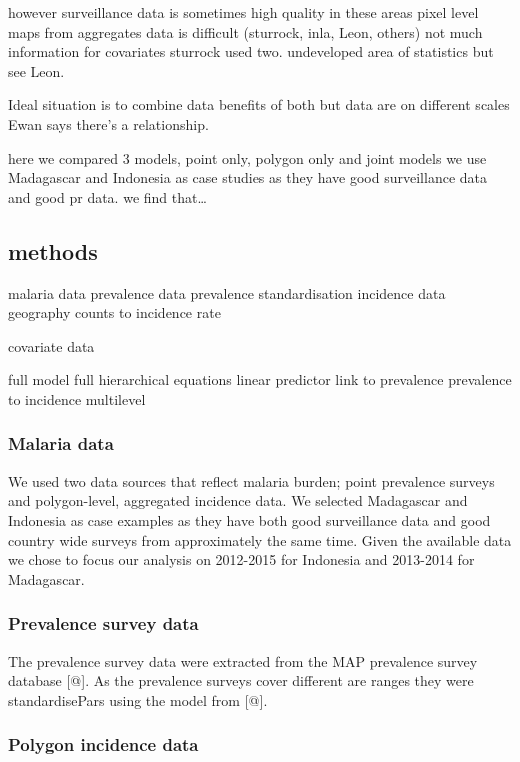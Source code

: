 however surveillance data is sometimes high quality in these areas pixel
level maps from aggregates data is difficult (sturrock, inla, Leon,
others) not much information for covariates sturrock used two.
undeveloped area of statistics but see Leon.

Ideal situation is to combine data benefits of both but data are on
different scales Ewan says there's a relationship.

here we compared 3 models, point only, polygon only and joint models we
use Madagascar and Indonesia as case studies as they have good
surveillance data and good pr data. we find that\ldots{}

\subsection{methods}\label{methods}

malaria data prevalence data prevalence standardisation incidence data
geography counts to incidence rate

covariate data

full model full hierarchical equations linear predictor link to
prevalence prevalence to incidence multilevel

\subsubsection{Malaria data}\label{malaria-data}

We used two data sources that reflect malaria burden; point prevalence
surveys and polygon-level, aggregated incidence data. We selected
Madagascar and Indonesia as case examples as they have both good
surveillance data and good country wide surveys from approximately the
same time. Given the available data we chose to focus our analysis on
2012-2015 for Indonesia and 2013-2014 for Madagascar.

\subsubsection{Prevalence survey data}\label{prevalence-survey-data}

The prevalence survey data were extracted from the MAP prevalence survey
database {[}@{]}. As the prevalence surveys cover different are ranges
they were standardisePars using the model from {[}@{]}.

\subsubsection{Polygon incidence data}\label{polygon-incidence-data}

